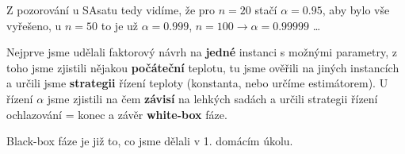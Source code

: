 \vspace{4pt}
\noindent Z pozorování u SAsatu tedy vidíme, že pro $n = 20$ stačí $\alpha = 0.95$, aby bylo vše vyřešeno, u $n = 50$ to je už $\alpha = 0.999$, $n = 100 \to \alpha = 0.99999$ \ldots

\vspace{4pt}
\noindent Nejprve jsme udělali faktorový návrh na \textbf{jedné} instanci s možnými parametry, z toho jsme zjistili nějakou \textbf{počáteční} teplotu, tu jsme ověřili na jiných instancích a určili jsme \textbf{strategii} řízení teploty (konstanta, nebo určíme estimátorem). U řízení $\alpha$ jsme zjistili na čem \textbf{závisí} na lehkých sadách a určili strategii řízení ochlazování = konec a závěr \textbf{white-box} fáze.

\vspace{4pt}
\noindent Black-box fáze je již to, co jsme dělali v 1. domácím úkolu.
